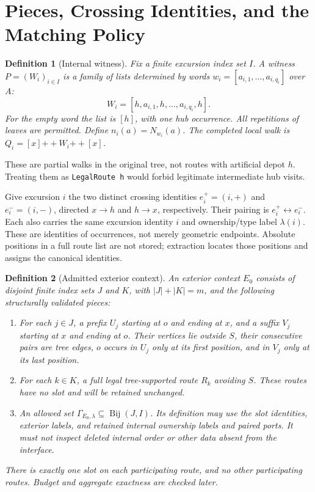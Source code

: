 \documentclass[11pt]{article}
\newtheorem{definition}{Definition}[section]
\theoremstyle{remark}
\newcommand{\cat}{\mathbin{+\!+}}
\newcommand{\code}[1]{\nolinkurl{#1}}
\begin{document}
\section{Pieces, Crossing Identities, and the Matching Policy}
\label{sec:pieces}

\begin{definition}[Internal witness]
Fix a finite excursion index set $I$. A witness $P=(W_i)_{i\in I}$ is a family
of lists determined by words $w_i=[a_{i,1},\ldots,a_{i,q_i}]$ over $A$:
\[
 W_i=[h,a_{i,1},h,\ldots,a_{i,q_i},h].
\]
For the empty word the list is $[h]$, with one hub occurrence.
All repetitions of leaves are permitted. Define $n_i(a)=N_{w_i}(a)$.
The completed local walk is $Q_i=[x]\cat W_i\cat[x]$.
\end{definition}

These are partial walks in the original tree, not routes with artificial depot
$h$. Treating them as \code{LegalRoute h} would forbid legitimate intermediate
hub visits.

Give excursion $i$ the two distinct crossing identities
$e_i^+=(i,+)$ and $e_i^-=(i,-)$, directed $x\to h$ and $h\to x$, respectively.
Their pairing is $e_i^+\leftrightarrow e_i^-$.
Each also carries the same excursion identity $i$ and ownership/type label
$\lambda(i)$. These are identities of occurrences, not merely geometric
endpoints. Absolute positions in a full route list are not stored; extraction
locates those positions and assigns the canonical identities.

\begin{definition}[Admitted exterior context]
An exterior context $E_0$ consists of disjoint finite index sets $J$ and $K$,
with $|J|+|K|=m$, and the following structurally validated pieces:
\begin{enumerate}
 \item For each $j\in J$, a prefix $U_j$ starting at $o$ and ending at $x$,
 and a suffix $V_j$ starting at $x$ and ending at $o$. Their vertices lie
 outside $S$, their consecutive pairs are tree edges, $o$ occurs in $U_j$
 only at its first position, and in $V_j$ only at its last position.
 \item For each $k\in K$, a full legal tree-supported route $R_k$ avoiding
 $S$. These routes have no slot and will be retained unchanged.
 \item An allowed set $\Gamma_{E_0,\lambda}\subseteq\operatorname{Bij}(J,I)$.
 Its definition may use the slot identities, exterior labels, and retained
 internal ownership labels and paired ports. It must not inspect deleted
 internal order or other data absent from the interface.
\end{enumerate}
There is exactly one slot on each participating route, and no other
participating routes. Budget and aggregate exactness are checked later.
\end{definition}
\end{document}
